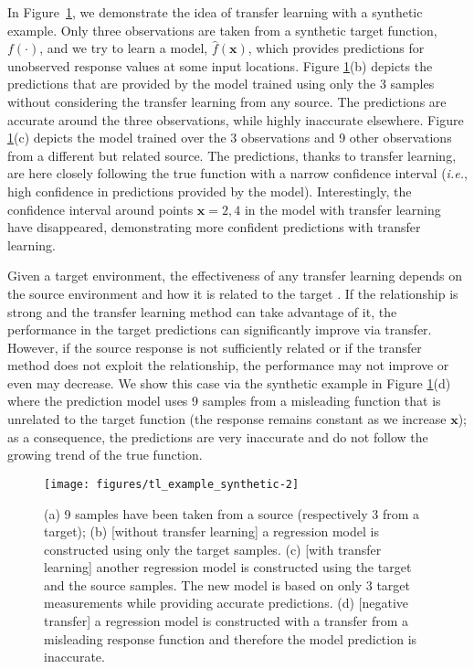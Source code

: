 In Figure~\ref{fig:example-synthetic}, we demonstrate the idea of transfer learning with a synthetic example. Only three observations are taken from a synthetic target function, $f(\cdot)$, and we try to learn a model, $\hat{f}(\mathbf{x})$, which provides predictions for unobserved response values at some input locations. Figure \ref{fig:example-synthetic}(b) depicts the predictions that are provided by the model trained using only the 3 samples without considering the transfer learning from any source. The predictions are accurate around the three observations, while highly inaccurate elsewhere. Figure \ref{fig:example-synthetic}(c) depicts the model trained over the 3 observations and 9 other observations from a different but related source. The predictions, thanks to transfer learning, are here closely following the true function with a narrow confidence interval (\emph{i.e.}, high confidence in predictions provided by the model). Interestingly, the confidence interval around points $\mathbf{x}=2,4$ in the model with transfer learning have disappeared, demonstrating more confident predictions with transfer learning.

Given a target environment, the effectiveness of any transfer learning depends on the source environment and how it is related to the target \cite{torrey2009transfer}. If the relationship is strong and the transfer learning method can take advantage of it, the performance in the target predictions can significantly improve via transfer. However, if the source response is not sufficiently related or if the transfer method does not exploit the relationship, the performance may not improve or even may decrease. We show this case via the synthetic example in Figure \ref{fig:example-synthetic}(d) where the prediction model uses 9 samples from a misleading function that is unrelated to the target function (the response remains constant as we increase $\mathbf{x}$); as a consequence, the predictions are very inaccurate and do not follow the growing trend of the true function. %

\begin{figure}[t]
	\begin{center}
		\texttt{[image: figures/tl\_example\_synthetic-2]}
		\caption{(a) 9 samples have been taken from a source (respectively 3 from a target); (b) [without transfer learning] a regression model is constructed using only the target samples. (c) [with transfer learning] another regression model is constructed using the target and the source samples. The new model is based on only 3 target measurements while providing accurate predictions. (d) [negative transfer] a regression model is constructed with a transfer from a misleading response function and therefore the model prediction is inaccurate.}
		\label{fig:example-synthetic}
	\end{center}
\end{figure}


